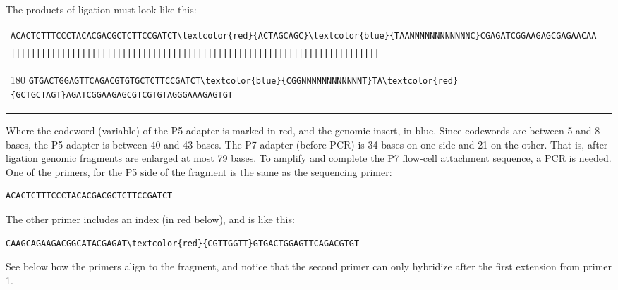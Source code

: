 \documentclass[a4paper,12pt,twosided]{article}
\begin{document}
The products of ligation must look like this:
\begin{flushleft}
\begin{tabular}{l}
   \Verb+ACACTCTTTCCCTACACGACGCTCTTCCGATCT\textcolor{red}{ACTAGCAGC}\textcolor{blue}{TAANNNNNNNNNNNNC}CGAGATCGGAAGAGCGAGAACAA+\\[-4pt]
   \Verb+|||||||||||||||||||||||||||||||||||||||||||||||||||||||||||||||||||||||||+\\[-10pt]
   \begin{turn}{180}
      \Verb+GTGACTGGAGTTCAGACGTGTGCTCTTCCGATCT\textcolor{blue}{CGGNNNNNNNNNNNNT}TA\textcolor{red}{GCTGCTAGT}AGATCGGAAGAGCGTCGTGTAGGGAAAGAGTGT+
   \end{turn}
\\
\end{tabular}
\end{flushleft}

Where the codeword (variable) of the P5 adapter is marked in red, and the genomic insert, in blue. Since codewords are between 5 and 8 bases, the P5 adapter is between 40 and 43 bases. The P7 adapter (before PCR) is 34 bases on one side and 21 on the other. That is, after ligation genomic fragments are enlarged at most 79 bases. To amplify and complete the P7 flow-cell attachment sequence, a PCR is needed. One of the primers, for the P5 side of the fragment is the same as the sequencing primer:

\begin{verbatim}
ACACTCTTTCCCTACACGACGCTCTTCCGATCT
\end{verbatim}

The other primer includes an index (in red below), and is like this:
\begin{Verbatim}[fontsize=\normalsize]
CAAGCAGAAGACGGCATACGAGAT\textcolor{red}{CGTTGGTT}GTGACTGGAGTTCAGACGTGT
\end{Verbatim}

See below how the primers align to the fragment, and notice that the second primer can only hybridize after the first extension from primer 1.
\end{document}
